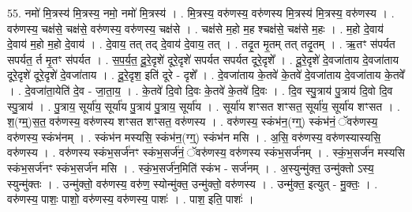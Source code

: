 \documentclass[17pt]{extarticle}
\begin{document}
55. नमो॑ मि॒त्रस्य॑ मि॒त्रस्य॒ नमो॒ नमो॑ मि॒त्रस्य॑ । . मि॒त्रस्य॒ वरु॑णस्य॒ वरु॑णस्य मि॒त्रस्य॑ मि॒त्रस्य॒ वरु॑णस्य । . वरु॑णस्य॒ चक्ष॑से॒ चक्ष॑से॒ वरु॑णस्य॒ वरु॑णस्य॒ चक्ष॑से । . चक्ष॑से म॒हो म॒ह श्चक्ष॑से॒ चक्ष॑से म॒हः । . म॒हो दे॒वाय॑ दे॒वाय॑ म॒हो म॒हो दे॒वाय॑ । . दे॒वाय॒ तत् तद् दे॒वाय॑ दे॒वाय॒ तत् । . तदृ॒त मृ॒तम् तत् तदृ॒तम् । . ऋ॒तꣳ स॑पर्यत सपर्यत॒ र्त मृ॒तꣳ स॑पर्यत । . स॒प॒र्य॒त॒ दू॒रे॒दृशे॑ दूरे॒दृशे॑ सपर्यत सपर्यत दूरे॒दृशे᳚ । . दू॒रे॒दृशे॑ दे॒वजा॑ताय दे॒वजा॑ताय दूरे॒दृशे॑ दूरे॒दृशे॑ दे॒वजा॑ताय । . दू॒रे॒दृश॒ इति॑ दूरे - दृशे᳚ । . दे॒वजा॑ताय के॒तवे॑ के॒तवे॑ दे॒वजा॑ताय दे॒वजा॑ताय के॒तवे᳚ । . दे॒वजा॑ता॒येति॑ दे॒व - जा॒ता॒य॒ । . के॒तवे॑ दि॒वो दि॒वः के॒तवे॑ के॒तवे॑ दि॒वः । . दि॒व स्पु॒त्राय॑ पु॒त्राय॑ दि॒वो दि॒व स्पु॒त्राय॑ । . पु॒त्राय॒ सूर्या॑य॒ सूर्या॑य पु॒त्राय॑ पु॒त्राय॒ सूर्या॑य । . सूर्या॑य शꣳसत शꣳसत॒ सूर्या॑य॒ सूर्या॑य शꣳसत । . श॒(ग्म्॒)स॒त॒ वरु॑णस्य॒ वरु॑णस्य शꣳसत शꣳसत॒ वरु॑णस्य । . वरु॑णस्य॒ स्कंभ॑न॒(ग्ग्॒) स्कंभ॑नं॒ ॅवरु॑णस्य॒ वरु॑णस्य॒ स्कंभ॑नम् । . स्कंभ॑न मस्यसि॒ स्कंभ॑न॒(ग्ग्॒) स्कंभ॑न मसि । . अ॒सि॒ वरु॑णस्य॒ वरु॑णस्यास्यसि॒ वरु॑णस्य । . वरु॑णस्य स्कंभ॒सर्ज॑नꣳ स्कंभ॒सर्ज॑नं॒ ॅवरु॑णस्य॒ वरु॑णस्य स्कंभ॒सर्ज॑नम् । . स्कं॒भ॒सर्ज॑न मस्यसि स्कंभ॒सर्ज॑नꣳ स्कंभ॒सर्ज॑न मसि । . स्कं॒भ॒सर्ज॑न॒मिति॑ स्कंभ - सर्ज॑नम् । . अ॒स्युन्मु॑क्त॒ उन्मु॑क्तो ऽस्य॒ स्युन्मु॑क्तः । . उन्मु॑क्तो॒ वरु॑णस्य॒ वरु॑ण॒ स्योन्मु॑क्त॒ उन्मु॑क्तो॒ वरु॑णस्य । . उन्मु॑क्त॒ इत्युत् - मु॒क्तः॒ । . वरु॑णस्य॒ पाशः॒ पाशो॒ वरु॑णस्य॒ वरु॑णस्य॒ पाशः॑ । . पाश॒ इति॒ पाशः॑ । \newline
\end{document}
